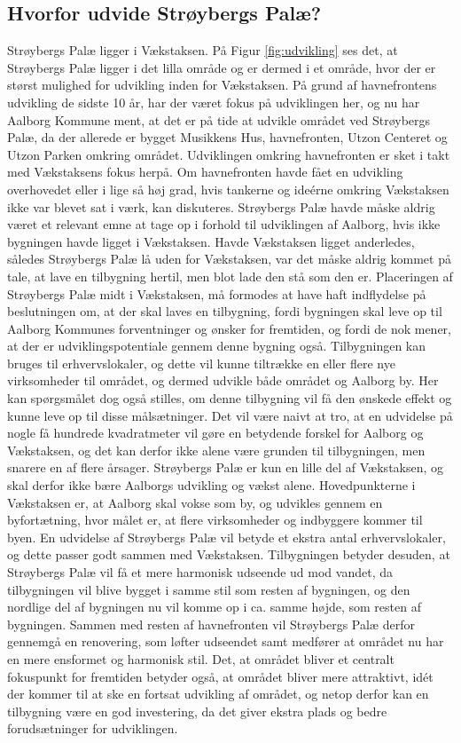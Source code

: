 \subsection{Hvorfor udvide Strøybergs Palæ?}
Strøybergs Palæ ligger i Vækstaksen. På Figur \ref{fig:udvikling} ses det, at Strøybergs Palæ ligger i det lilla område og er dermed i et område, hvor der er størst mulighed for udvikling inden for Vækstaksen. På grund af havnefrontens udvikling de sidste 10 år, har der været fokus på udviklingen her, og nu har Aalborg Kommune ment, at det er på tide at udvikle området ved Strøybergs Palæ, da der allerede er bygget Musikkens Hus, havnefronten, Utzon Centeret og Utzon Parken omkring området. Udviklingen omkring havnefronten er sket i takt med Vækstaksens fokus herpå. Om havnefronten havde fået en udvikling overhovedet eller i lige så høj grad, hvis tankerne og ideérne omkring Vækstaksen ikke var blevet sat i værk, kan diskuteres. Strøybergs Palæ havde måske aldrig været et relevant emne at tage op i forhold til udviklingen af Aalborg, hvis ikke bygningen havde ligget i Vækstaksen. Havde Vækstaksen ligget anderledes, således Strøybergs Palæ lå uden for Vækstaksen, var det måske aldrig kommet på tale, at lave en tilbygning hertil, men blot lade den stå som den er. Placeringen af Strøybergs Palæ midt i Vækstaksen, må formodes at have haft indflydelse på beslutningen om, at der skal laves en tilbygning, fordi bygningen skal leve op til Aalborg Kommunes forventninger og ønsker for fremtiden, og fordi de nok mener, at der er udviklingspotentiale gennem denne bygning også. Tilbygningen kan bruges til erhvervslokaler, og dette vil kunne tiltrække en eller flere nye virksomheder til området, og dermed udvikle både området og Aalborg by. Her kan spørgsmålet dog også stilles, om denne tilbygning vil få den ønskede effekt og kunne leve op til disse målsætninger. Det vil være naivt at tro, at en udvidelse på nogle få hundrede kvadratmeter vil gøre en betydende forskel for Aalborg og Vækstaksen, og det kan derfor ikke alene være grunden til tilbygningen, men snarere en af flere årsager. Strøybergs Palæ er kun en lille del af Vækstaksen, og skal derfor ikke bære Aalborgs udvikling og vækst alene.
\newline \indent{     }  Hovedpunkterne i Vækstaksen er, at Aalborg skal vokse som by, og udvikles gennem en byfortætning, hvor målet er, at flere virksomheder og indbyggere kommer til byen. En udvidelse af Strøybergs Palæ vil betyde et ekstra antal erhvervslokaler, og dette passer godt sammen med Vækstaksen. Tilbygningen betyder desuden, at Strøybergs Palæ vil få et mere harmonisk udseende ud mod vandet, da tilbygningen vil blive bygget i samme stil som resten af bygningen, og den nordlige del af bygningen nu vil komme op i ca. samme højde, som resten af bygningen. Sammen med resten af havnefronten vil Strøybergs Palæ derfor gennemgå en renovering, som løfter udseendet samt medfører at området nu har en mere ensformet og harmonisk stil. 
\newline \indent{     }  Det, at området bliver et centralt fokuspunkt for fremtiden betyder også, at området bliver mere attraktivt, idét der kommer til at ske en fortsat udvikling af området, og netop derfor kan en tilbygning være en god investering, da det giver ekstra plads og bedre forudsætninger for udviklingen.